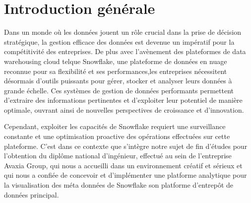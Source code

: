 \chapter*{Introduction générale}

\par Dans un monde où les données jouent un rôle crucial dans la prise de décision stratégique, 
la gestion efficace des données est devenue un impératif pour la compétitivité des entreprises.
De plus avec l'avènement des plateformes de data warehousing cloud telque Snowflake, une plateforme de 
données en nuage reconnue pour sa flexibilité et ses performances,les entreprises nécessitent désormais d'outils puissants pour gérer,
stocker et analyser leurs données à grande échelle. Ces systèmes de gestion de données performants permettent d'extraire 
des informations pertinentes et d'exploiter leur potentiel de manière optimale, ouvrant ainsi de nouvelles perspectives de croissance et d'innovation.
\par Cependant, exploiter les capacités de Snowflake requiert une surveillance constante et une optimisation 
proactive des opérations effectuées sur cette plateforme. C'est dans ce contexte que s'intègre notre sujet de fin d'études 
pour l'obtention du diplôme national d'ingénieur, effectué au sein de l'entreprise Avaxia Group, qui nous a accueilli dans
un environnement créatif et sérieux et qui nous a confiée de concevoir et d'implémenter une platforme analytique pour la 
visualisation des méta données de Snowflake son platforme d'entrepôt de données principal.

